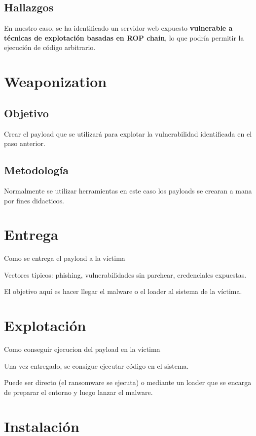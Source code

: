 \subsection{Hallazgos}

En nuestro caso, se ha identificado un servidor web expuesto 
\textbf{vulnerable a técnicas de explotación basadas en ROP chain}, 
lo que podría permitir la ejecución de código arbitrario.



\section{Weaponization}

\subsection{Objetivo}

Crear el payload que se utilizará para explotar la vulnerabilidad identificada 
en el paso anterior.

\subsection{Metodología}

Normalmente se utilizar herramientas en este caso los payloads se crearan a mana 
por fines didacticos.

\section{Entrega}

Como se entrega el payload a la víctima

Vectores típicos: phishing, vulnerabilidades sin parchear, credenciales expuestas.

El objetivo aquí es hacer llegar el malware o el loader al sistema de la víctima.

\section{Explotación}

Como conseguir ejecucion del payload en la víctima

Una vez entregado, se consigue ejecutar código en el sistema.

Puede ser directo (el ransomware se ejecuta) o mediante un loader que se encarga 
de preparar el entorno y luego lanzar el malware.

\section{Instalación}

